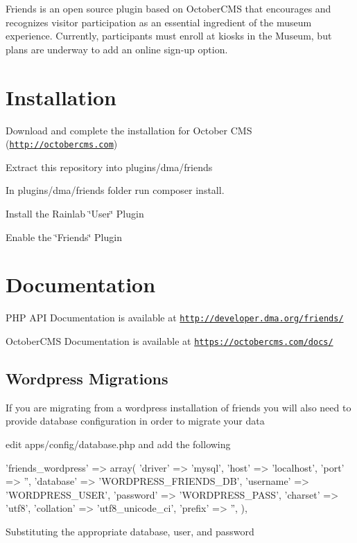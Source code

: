 Friends is an open source plugin based on October\+C\+M\+S that encourages and recognizes visitor participation as an essential ingredient of the museum experience. Currently, participants must enroll at kiosks in the Museum, but plans are underway to add an online sign-\/up option.

\section*{Installation}


\begin{DoxyItemize}
\item Download and complete the installation for October C\+M\+S (\href{http://octobercms.com}{\tt http\+://octobercms.\+com})
\item Extract this repository into plugins/dma/friends
\item In plugins/dma/friends folder run {\ttfamily composer install}.
\item Install the Rainlab \char`\"{}\+User\char`\"{} Plugin
\item Enable the \char`\"{}\+Friends\char`\"{} Plugin
\end{DoxyItemize}

\section*{Documentation}

P\+H\+P A\+P\+I Documentation is available at \href{http://developer.dma.org/friends/}{\tt http\+://developer.\+dma.\+org/friends/}

October\+C\+M\+S Documentation is available at \href{https://octobercms.com/docs/}{\tt https\+://octobercms.\+com/docs/}

\subsection*{Wordpress Migrations}

If you are migrating from a wordpress installation of friends you will also need to provide database configuration in order to migrate your data


\begin{DoxyItemize}
\item edit apps/config/database.\+php and add the following 
\begin{DoxyPre}
        'friends\_wordpress' => array(
            'driver'    => 'mysql',
            'host'      => 'localhost',
            'port'      => '', 
            'database'  => 'WORDPRESS\_FRIENDS\_DB',
            'username'  => 'WORDPRESS\_USER',
            'password'  => 'WORDPRESS\_PASS',
            'charset'   => 'utf8',
            'collation' => 'utf8\_unicode\_ci',
            'prefix'    => '', 
        ), 
\end{DoxyPre}
 Substituting the appropriate database, user, and password 
\end{DoxyItemize}